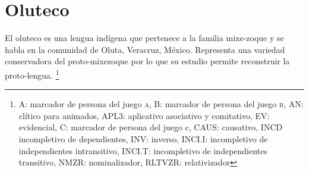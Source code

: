 \section*{Oluteco}

\noindent El oluteco es una lengua indígena que pertenece a la familia mixe-zoque y se habla en la comunidad de Oluta, Veracruz, México. Representa una variedad conservadora del proto-mixezoque por lo que su estudio permite reconstruir la proto-lengua.
\footnote{A: marcador de persona del juego \textsc{a}, B: marcador de persona del juego \textsc{b}, AN: clítico para animados, APL3: aplicativo asociativo y comitativo, EV: evidencial, C: marcador de persona del juego c, CAUS: causativo,  INCD incompletivo de dependientes, INV: inverso, INCI.I: incompletivo de independientes intransitivo, INCI.T: incompletivo de independientes transitivo, NMZR: nominalizador, RLTVZR: relativizador}
\vspace{0.5cm}

